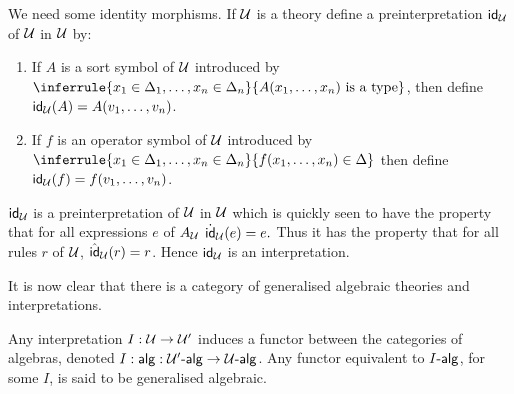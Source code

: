 We need some identity morphisms.
%
If $\mathcal{U}$ is a theory define a preinterpretation $\mathsf{id}_{\mathcal{U}}$ of $\mathcal{U}$ in $\mathcal{U}$ by:
\begin{enumerate}
\item If $A$ is a sort symbol of $\mathcal{U}$ introduced by $\inferrule{x_1\in\Delta_1,\ldots,x_n\in\Delta_n}{A(x_1,\ldots,x_n)\isatype}$, then define $\mathsf{id}_{\mathcal{U}}(A)=A(v_1,\ldots,v_n)$.
\item If $f$ is an operator symbol of $\mathcal{U}$ introduced by $\inferrule{x_1\in\Delta_1,\ldots,x_n\in\Delta_n}{f(x_1,\ldots,x_n)\in\Delta}$ then define $\mathsf{id}_{\mathcal{U}}(f)=f(v_1,\ldots,v_n)$.
\end{enumerate}

$\mathsf{id}_{\mathcal{U}}$ is a preinterpretation of $\mathcal{U}$ in $\mathcal{U}$ which is quickly seen to have the property that for all expressions $e$ of $A_{\mathcal{U}}$ $\dot {\mathsf{id}}_{\mathcal{U}}(e)=e.$
%
Thus it has the property that for all rules $r$ of $\mathcal{U}$, $\hat{\mathsf{id}}_{\mathcal{U}}(r)=r$.
%
Hence $\mathsf{id}_{\mathcal{U}}$ is an interpretation.

It is now clear that there is a category of generalised algebraic theories and interpretations.

Any interpretation $I:\mathcal{U}\to\mathcal{U}'$ induces a functor between the categories of algebras, denoted $I:\mathsf{alg}: \mathcal{U}'\text{-}\mathsf{alg}\to\mathcal{U}\text{-}\mathsf{alg}$.
%
Any functor equivalent to $I\text{-}\mathsf{alg}$, for some $I$, is said to be generalised algebraic.


